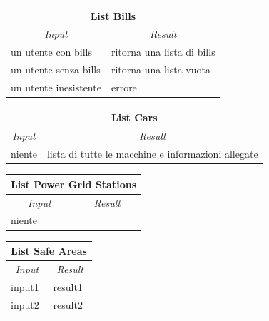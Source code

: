 \documentclass[english]{article}
\begin{document}
\begin{center}
	\begin{tabular}{ | m{6cm} | m{6cm} | }
		\hline
		\multicolumn{2}{|c|}{\textbf{List Bills}} \\
		\hline
		\multicolumn{1}{|c|}{\textit{Input}} & \multicolumn{1}{c|}{\textit{Result}} \\
		\hline
		un utente con bills & ritorna una lista di bills \\
		\hline
		un utente senza bills & ritorna una lista vuota \\
		\hline
		un utente inesistente & errore \\
		\hline
	\end{tabular}
\end{center}

\begin{center}
	\begin{tabular}{ | m{6cm} | m{6cm} | }
		\hline
		\multicolumn{2}{|c|}{\textbf{List Cars}} \\
		\hline
		\multicolumn{1}{|c|}{\textit{Input}} & \multicolumn{1}{c|}{\textit{Result}} \\
		\hline
		niente & lista di tutte le macchine e informazioni allegate \\
		\hline
	\end{tabular}
\end{center}

\begin{center}
	\begin{tabular}{ | m{6cm} | m{6cm} | }
		\hline
		\multicolumn{2}{|c|}{\textbf{List Power Grid Stations}} \\
		\hline
		\multicolumn{1}{|c|}{\textit{Input}} & \multicolumn{1}{c|}{\textit{Result}} \\
		\hline
		niente &  \\
		\hline
	\end{tabular}
\end{center}

\begin{center}
	\begin{tabular}{ | m{6cm} | m{6cm} | }
		\hline
		\multicolumn{2}{|c|}{\textbf{List Safe Areas}} \\
		\hline
		\multicolumn{1}{|c|}{\textit{Input}} & \multicolumn{1}{c|}{\textit{Result}} \\
		\hline
		input1 & result1 \\
		\hline
		input2 & result2 \\
		\hline
	\end{tabular}
\end{center}
\end{document}
